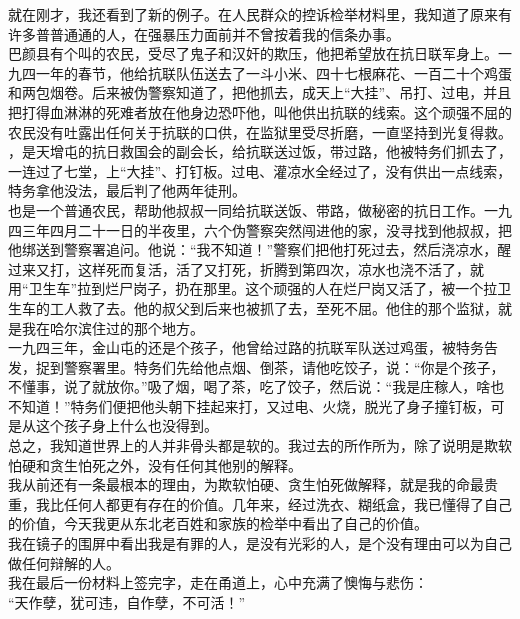 就在刚才，我还看到了新的例子。在人民群众的控诉检举材料里，我知道了原来有许多普普通通的人，在强暴压力面前并不曾按着我的信条办事。\\

巴颜县有个叫的农民，受尽了鬼子和汉奸的欺压，他把希望放在抗日联军身上。一九四一年的春节，他给抗联队伍送去了一斗小米、四十七根麻花、一百二十个鸡蛋和两包烟卷。后来被伪警察知道了，把他抓去，成天上“大挂”、吊打、过电，并且把打得血淋淋的死难者放在他身边恐吓他，叫他供出抗联的线索。这个顽强不屈的农民没有吐露出任何关于抗联的口供，在监狱里受尽折磨，一直坚持到光复得救。\\

，是天增屯的抗日救国会的副会长，给抗联送过饭，带过路，他被特务们抓去了，一连过了七堂，上“大挂”、打钉板。过电、灌凉水全经过了，没有供出一点线索，特务拿他没法，最后判了他两年徒刑。\\

也是一个普通农民，帮助他叔叔一同给抗联送饭、带路，做秘密的抗日工作。一九四三年四月二十一日的半夜里，六个伪警察突然闯进他的家，没寻找到他叔叔，把他绑送到警察署追问。他说：“我不知道！”警察们把他打死过去，然后浇凉水，醒过来又打，这样死而复活，活了又打死，折腾到第四次，凉水也浇不活了，就用“卫生车”拉到烂尸岗子，扔在那里。这个顽强的人在烂尸岗又活了，被一个拉卫生车的工人救了去。他的叔父到后来也被抓了去，至死不屈。他住的那个监狱，就是我在哈尔滨住过的那个地方。\\

一九四三年，金山屯的还是个孩子，他曾给过路的抗联军队送过鸡蛋，被特务告发，捉到警察署里。特务们先给他点烟、倒茶，请他吃饺子，说：“你是个孩子，不懂事，说了就放你。”吸了烟，喝了茶，吃了饺子，然后说：“我是庄稼人，啥也不知道！”特务们便把他头朝下挂起来打，又过电、火烧，脱光了身子撞钉板，可是从这个孩子身上什么也没得到。\\

总之，我知道世界上的人并非骨头都是软的。我过去的所作所为，除了说明是欺软怕硬和贪生怕死之外，没有任何其他别的解释。\\

我从前还有一条最根本的理由，为欺软怕硬、贪生怕死做解释，就是我的命最贵重，我比任何人都更有存在的价值。几年来，经过洗衣、糊纸盒，我已懂得了自己的价值，今天我更从东北老百姓和家族的检举中看出了自己的价值。\\

我在镜子的围屏中看出我是有罪的人，是没有光彩的人，是个没有理由可以为自己做任何辩解的人。\\

我在最后一份材料上签完字，走在甬道上，心中充满了懊悔与悲伤：\\

“天作孽，犹可违，自作孽，不可活！”
